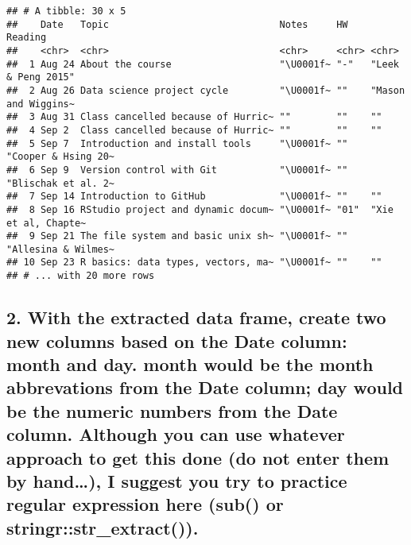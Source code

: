 \documentclass[
]{article}
\newenvironment{Shaded}{\begin{snugshade}}{\end{snugshade}}
\newcommand{\FunctionTok}[1]{\textcolor[rgb]{0.00,0.00,0.00}{#1}}
\newcommand{\NormalTok}[1]{#1}
\newcommand{\OtherTok}[1]{\textcolor[rgb]{0.56,0.35,0.01}{#1}}
\newcommand{\SpecialCharTok}[1]{\textcolor[rgb]{0.00,0.00,0.00}{#1}}
\newcommand{\StringTok}[1]{\textcolor[rgb]{0.31,0.60,0.02}{#1}}
\begin{document}
\begin{verbatim}
## # A tibble: 30 x 5
##    Date   Topic                              Notes     HW    Reading            
##    <chr>  <chr>                              <chr>     <chr> <chr>              
##  1 Aug 24 About the course                   "\U0001f~ "-"   "Leek & Peng 2015" 
##  2 Aug 26 Data science project cycle         "\U0001f~ ""    "Mason and Wiggins~
##  3 Aug 31 Class cancelled because of Hurric~ ""        ""    ""                 
##  4 Sep 2  Class cancelled because of Hurric~ ""        ""    ""                 
##  5 Sep 7  Introduction and install tools     "\U0001f~ ""    "Cooper & Hsing 20~
##  6 Sep 9  Version control with Git           "\U0001f~ ""    "Blischak et al. 2~
##  7 Sep 14 Introduction to GitHub             "\U0001f~ ""    ""                 
##  8 Sep 16 RStudio project and dynamic docum~ "\U0001f~ "01"  "Xie et al, Chapte~
##  9 Sep 21 The file system and basic unix sh~ "\U0001f~ ""    "Allesina & Wilmes~
## 10 Sep 23 R basics: data types, vectors, ma~ "\U0001f~ ""    ""                 
## # ... with 20 more rows
\end{verbatim}

\hypertarget{with-the-extracted-data-frame-create-two-new-columns-based-on-the-date-column-month-and-day.-month-would-be-the-month-abbrevations-from-the-date-column-day-would-be-the-numeric-numbers-from-the-date-column.-although-you-can-use-whatever-approach-to-get-this-done-do-not-enter-them-by-hand-i-suggest-you-try-to-practice-regular-expression-here-sub-or-stringrstr_extract.}{%
\subsection{2. With the extracted data frame, create two new columns
based on the Date column: month and day. month would be the month
abbrevations from the Date column; day would be the numeric numbers from
the Date column. Although you can use whatever approach to get this done
(do not enter them by hand\ldots), I suggest you try to practice regular
expression here (sub() or
stringr::str\_extract()).}\label{with-the-extracted-data-frame-create-two-new-columns-based-on-the-date-column-month-and-day.-month-would-be-the-month-abbrevations-from-the-date-column-day-would-be-the-numeric-numbers-from-the-date-column.-although-you-can-use-whatever-approach-to-get-this-done-do-not-enter-them-by-hand-i-suggest-you-try-to-practice-regular-expression-here-sub-or-stringrstr_extract.}}

\begin{Shaded}
\end{Shaded}
\end{document}
